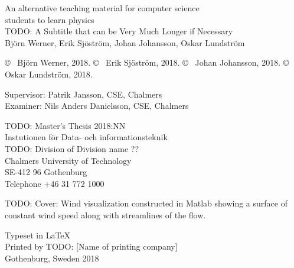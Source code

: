 \newpage
\thispagestyle{plain}
\vspace*{4.5cm}
An alternative teaching material for computer science \\ students to learn physics\\
TODO: A Subtitle that can be Very Much Longer if Necessary\\
Björn Werner, Erik Sjöström, Johan Johansson, Oskar Lundström \setlength{\parskip}{1cm}

\copyright ~ Björn Werner, 2018. \setlength{\parskip}{1cm}
\copyright ~ Erik Sjöström, 2018. \setlength{\parskip}{1cm}
\copyright ~ Johan Johansson, 2018. \setlength{\parskip}{1cm}
\copyright ~ Oskar Lundström, 2018. \setlength{\parskip}{1cm}

Supervisor: Patrik Jansson, CSE, Chalmers\\
Examiner: Nils Anders Danielsson, CSE, Chalmers \setlength{\parskip}{1cm}

TODO: Master's Thesis 2018:NN\\	%
Instutionen för Data- och informationsteknik \\
TODO: Division of Division name ??\\
Chalmers University of Technology\\
SE-412 96 Gothenburg\\
Telephone +46 31 772 1000
\setlength{\parskip}{0.5cm}%

\vfill
TODO: Cover: Wind visualization constructed in Matlab showing a surface of constant wind speed along with streamlines of the flow.
\setlength{\parskip}{0.5cm}%

Typeset in \LaTeX \\
Printed by TODO: [Name of printing company]\\
Gothenburg, Sweden 2018
